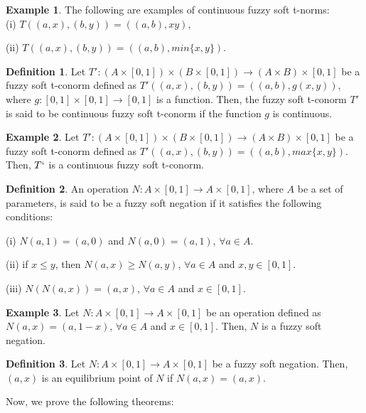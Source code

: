 \documentclass{article}
\theoremstyle{definition}
\newtheorem{definition}{Definition}[section]
\newtheorem{example}{Example}[section]
\begin{document}
\begin{example}
    The following are examples of continuous fuzzy soft t-norms:\\
    
(i) $T((a, x), (b, y)) = ((a, b), xy)$,

    (ii) $T((a, x), (b, y)) = ((a, b), min\{x, y\})$.
\end{example}
\begin{definition}
    Let $T':(A\times[0, 1])\times (B\times[0, 1]) \to (A\times B)\times[0, 1]$ be a fuzzy soft t-conorm defined as  $T'((a, x), (b, y)) = ((a, b), g(x, y))$, where $g:[0, 1]\times [0, 1] \to [0, 1]$ is a function. Then, the fuzzy soft t-conorm $T'$ is said to be continuous fuzzy soft t-conorm if the function $g$ is continuous. 
\end{definition}
\begin{example}
     Let $T':(A\times[0, 1])\times (B\times[0, 1]) \to (A\times B)\times[0, 1]$ be a fuzzy soft t-conorm defined as $T'((a, x), (b, y)) = ((a, b), max\{x, y\})$. Then, $T`$ is a continuous fuzzy soft t-conorm.
\end{example}
\begin{definition}
    An operation $N:A\times[0, 1] \to A\times[0, 1]$, where $A$ be a set of parameters, is said to be a fuzzy soft negation if it satisfies the following conditions:

    (i) $N(a, 1)=(a, 0)$ and $N(a, 0)=(a, 1)$, $\forall a\in A$.

    (ii) if $x\leq y$, then $N(a, x)\geq N(a, y)$, $\forall a\in A$ and $x, y \in [0, 1]$.

    (iii) $N(N(a, x))=(a, x)$, $\forall a\in A$ and $x \in [0, 1]$.
\end{definition}

\begin{example}
    Let $N:A\times[0, 1] \to A\times[0, 1]$ be an operation defined as $N(a, x)=(a, 1-x)$, $\forall a\in A$ and $x\in [0, 1]$. Then, $N$ is a fuzzy soft negation.
\end{example}

\begin{definition}
    Let $N:A\times[0, 1] \to A\times[0, 1]$ be a fuzzy soft negation. Then, $(a, x)$ is an equilibrium point of $N$ if $N(a, x)=(a, x)$.
\end{definition}

Now, we prove the following theorems:\\
\end{document}
